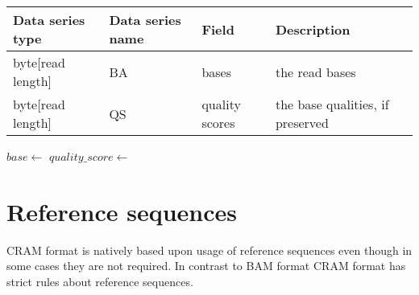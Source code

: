 \documentclass[a4paper]{article}
\begin{document}
\begin{tabular}{|>{\raggedright}p{88pt}|>{\raggedright}p{83pt}|>{\raggedright}p{85pt}|>{\raggedright}p{180pt}|}
\hline
\textbf{Data series type} & \textbf{Data series name} & \textbf{Field} & \textbf{Description}\tabularnewline
\hline
byte[read length] & BA & bases & the read bases\tabularnewline
\hline
byte[read length] & QS & quality scores & the base qualities, if preserved\tabularnewline
\hline
\end{tabular}

\vskip20pt
\begin{algorithmic}[1]
    \State $base\gets$ 
  \EndFor
      \State $quality\_score\gets$ 
    \EndFor
  \EndIf
\EndProcedure
\end{algorithmic}

\section{\textbf{Reference sequences}}

CRAM format is natively based upon usage of reference sequences even though in 
some cases they are not required. In contrast to BAM format CRAM format has strict 
rules about reference sequences. 
\end{document}
